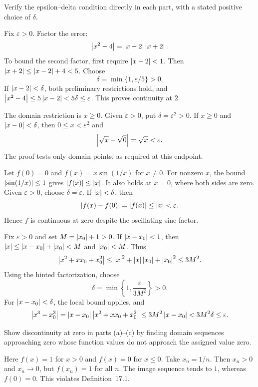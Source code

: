 \goal Verify the epsilon--delta condition directly in each
part, with a stated positive choice of $\delta$.

Fix $\varepsilon>0$. Factor the error:
\[
 \left|x^2-4\right|=\left|x-2\right|\left|x+2\right|.
\]
To bound the second factor, first require $\left|x-2\right|<1$.
Then
$\left|x+2\right|\le\left|x-2\right|+4<5$.
Choose
\[
 \delta=\min\{1,\varepsilon/5\}>0.
\]
If $\left|x-2\right|<\delta$, both preliminary restrictions hold,
and $\left|x^2-4\right|\le5\left|x-2\right|<5\delta\le\varepsilon$.
This proves continuity at $2$.

The domain restriction is $x\ge0$. Given $\varepsilon>0$,
put $\delta=\varepsilon^2>0$. If $x\ge0$ and
$\left|x-0\right|<\delta$, then $0\le x<\varepsilon^2$ and
\[
 \left|\sqrt x-\sqrt0\right|=\sqrt x<\varepsilon.
\]
The proof tests only domain points, as required at this endpoint.

Let $f(0)=0$ and $f(x)=x\sin(1/x)$ for $x\ne0$.
For nonzero $x$, the bound $\left|\sin(1/x)\right|\le1$ gives
$\left|f(x)\right|\le\left|x\right|$. It also holds at $x=0$, where
both sides are zero. Given $\varepsilon>0$, choose
$\delta=\varepsilon$. If $\left|x\right|<\delta$, then
\[
 \left|f(x)-f(0)\right|=\left|f(x)\right|\le\left|x\right|<\varepsilon.
\]
Hence $f$ is continuous at zero despite the oscillating sine factor.

Fix $\varepsilon>0$ and set $M=\left|x_0\right|+1>0$.
If $\left|x-x_0\right|<1$, then
$\left|x\right|\le\left|x-x_0\right|+\left|x_0\right|<M$ and
$\left|x_0\right|<M$. Thus
\[
 \left|x^2+xx_0+x_0^2\right|
 \le\left|x\right|^2+\left|x\right|\left|x_0\right|+\left|x_0\right|^2
 \le3M^2.
\]
Using the hinted factorization, choose
\[
 \delta=\min\left\{1,\frac{\varepsilon}{3M^2}\right\}>0.
\]
For $\left|x-x_0\right|<\delta$, the local bound applies, and
\[
 \left|x^3-x_0^3\right|
 =\left|x-x_0\right|\left|x^2+xx_0+x_0^2\right|
 \le3M^2\left|x-x_0\right|<3M^2\delta\le\varepsilon.
\]

\goal Show discontinuity at zero in parts (a)--(c) by finding
domain sequences approaching zero whose function values do not
approach the assigned value zero.

Here $f(x)=1$ for $x>0$ and $f(x)=0$ for $x\le0$.
Take $x_n=1/n$. Then $x_n>0$ and $x_n\to0$, but
$f(x_n)=1$ for all $n$. The image sequence tends to $1$,
whereas $f(0)=0$. This violates Definition~17.1.

